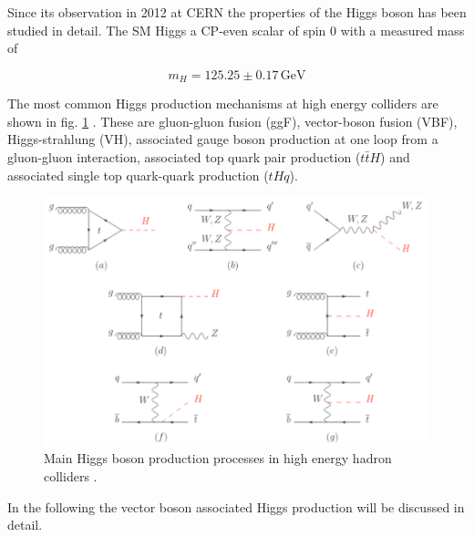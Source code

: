 Since its observation in 2012 at CERN \cite{Chatrchyan_2012} the properties of the Higgs boson has been studied in detail. The SM Higgs a CP-even scalar of spin 0 with a measured mass of

\begin{equation*}
	m_H = 125.25 \pm 0.17 \, \text{GeV}
\end{equation*}

The most common Higgs production mechanisms at high energy colliders are shown in fig. \ref{fig:higgsproduction} \cite{Workman:2022ynf}. These are gluon-gluon fusion (ggF), vector-boson fusion (VBF), Higgs-strahlung (VH), associated gauge boson production at one loop from a gluon-gluon interaction, associated top quark pair production ($t\bar{t}H$) and associated single top quark-quark production ($tHq$).

\begin{figure}[h!]
	\centering
	\includegraphics[width=0.8\linewidth]{figures/theory/higgsproduction.png}
	\caption{Main Higgs boson production processes in high energy hadron colliders \cite{Workman:2022ynf}.}
	\label{fig:higgsproduction}
\end{figure}

In the following the vector boson associated Higgs production will be discussed in detail.

